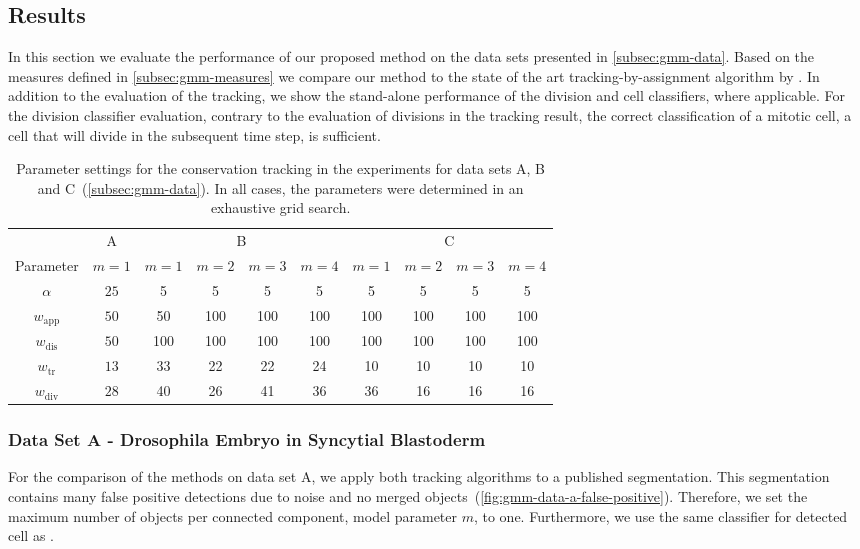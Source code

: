 \subsection{Results}
\label{subsec:gmm-results}
In this section we evaluate the performance of our proposed method on the data sets presented in
\cref{subsec:gmm-data}. Based on the measures defined in \cref{subsec:gmm-measures} we compare our
method to the state of the art tracking-by-assignment algorithm by \citet{kausler_12_discrete}.  In
addition to the evaluation of the tracking, we show the stand-alone performance of the division and
cell classifiers, where applicable. For the division classifier evaluation, contrary to the
evaluation of divisions in the tracking result, the correct classification of a mitotic cell, \ie a
cell that will divide in the subsequent time step, is sufficient.


\begin{table}
    \centering\small
    \begin{tabularx}{\textwidth}{c||c|cccc|cccc}
        \toprule
        & A & \multicolumn{4}{c|}{B} &
        \multicolumn{4}{c}{C} \\ 
        Parameter& $m=1$ & $m=1$ & $m=2$ & $m=3$ & $m=4$ & $m=1$ & $m=2$ & $m=3$ & $m=4$\\ \hline\small
        $\alpha$ & $25$ &5&5&5&5&5&5&5&5\\
        $w_{\text{app}}$ & $50$ &50&100&100&100&100&100&100&100\\
        $w_{\text{dis}}$ & $50$ &100&100&100&100&100&100&100&100\\
        $w_{\text{tr}}$ & $13$ &33&22&22&24&10&10&10&10\\
        $w_{\text{div}}$ & $28$ &40&26&41&36&36&16&16&16\\
        \bottomrule
    \end{tabularx}
    \caption[Conservation tracking - parameter settings]{Parameter settings for the conservation
        tracking in the experiments for data sets A, B and C~(\cref{subsec:gmm-data}). In all cases,
    the parameters were determined in an exhaustive grid search.}
    \label{tab:gmm-experiments-parameters}
\end{table}

\subsubsection{Data Set A -  Drosophila Embryo in Syncytial Blastoderm}
\label{subsubsec:gmm-reults-data-a}
For the comparison of the methods on data set A, we apply both tracking algorithms to a published
segmentation. This segmentation contains many false positive detections due to noise and
no merged objects~(\cref{fig:gmm-data-a-false-positive}). Therefore, we set the maximum number of
objects per connected component, model parameter $m$, to one. Furthermore, we use the same
classifier for detected cell as \citet{kausler_12_discrete}.

